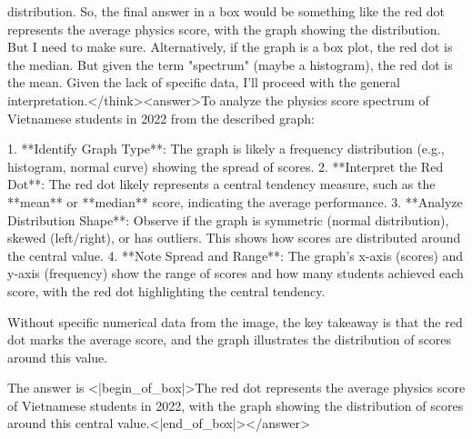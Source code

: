 distribution. So, the final answer in a box would be something like the red dot represents the average physics score, with the graph showing the distribution. But I need to make sure. Alternatively, if the graph is a box plot, the red dot is the median. But given the term "spectrum" (maybe a histogram), the red dot is the mean. Given the lack of specific data, I'll proceed with the general interpretation.</think><answer>To analyze the physics score spectrum of Vietnamese students in 2022 from the described graph:  

1. **Identify Graph Type**: The graph is likely a frequency distribution (e.g., histogram, normal curve) showing the spread of scores.  
2. **Interpret the Red Dot**: The red dot likely represents a central tendency measure, such as the **mean** or **median** score, indicating the average performance.  
3. **Analyze Distribution Shape**: Observe if the graph is symmetric (normal distribution), skewed (left/right), or has outliers. This shows how scores are distributed around the central value.  
4. **Note Spread and Range**: The graph’s x-axis (scores) and y-axis (frequency) show the range of scores and how many students achieved each score, with the red dot highlighting the central tendency.  

Without specific numerical data from the image, the key takeaway is that the red dot marks the average score, and the graph illustrates the distribution of scores around this value.  

The answer is <|begin_of_box|>The red dot represents the average physics score of Vietnamese students in 2022, with the graph showing the distribution of scores around this central value.<|end_of_box|></answer>